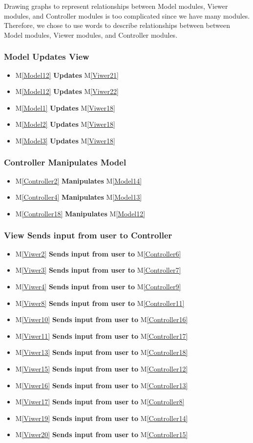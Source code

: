 \documentclass[12pt, titlepage]{article}
\newcommand{\mref}[1]{M\ref{#1}}
\begin{document}
\noindent Drawing graphs to represent relationships between Model modules, Viewer modules, and 
Controller modules is too complicated since we have many modules. Therefore, we chose to 
use words to describe relationships between between Model modules, Viewer modules, and 
Controller modules.

\newcommand{\vb}{\textbf{Updates }}
\subsubsection{Model Updates View}
\begin{itemize}
\item \mref{Model12} \vb \mref{Viwer21}
\item \mref{Model12} \vb \mref{Viwer22}
\item \mref{Model1} \vb \mref{Viwer18}
\item \mref{Model2} \vb \mref{Viwer18}
\item \mref{Model3} \vb \mref{Viwer18}
\end{itemize}

\renewcommand{\vb}{\textbf{Manipulates }}
\subsubsection{Controller Manipulates Model}
\begin{itemize}
\item \mref{Controller2} \vb \mref{Model14}
\item \mref{Controller4} \vb \mref{Model13}
\item \mref{Controller18} \vb \mref{Model12}
\end{itemize}

\renewcommand{\vb}{\textbf{Sends input from user to }}
\subsubsection{View Sends input from user to Controller}
\begin{itemize}
\item \mref{Viwer2} \vb \mref{Controller6}
\item \mref{Viwer3} \vb \mref{Controller7}
\item \mref{Viwer4} \vb \mref{Controller9}
\item \mref{Viwer8} \vb \mref{Controller11}
\item \mref{Viwer10} \vb \mref{Controller16}
\item \mref{Viwer11} \vb \mref{Controller17}
\item \mref{Viwer13} \vb \mref{Controller18}
\item \mref{Viwer15} \vb \mref{Controller12}
\item \mref{Viwer16} \vb \mref{Controller13}
\item \mref{Viwer17} \vb \mref{Controller8}
\item \mref{Viwer19} \vb \mref{Controller14}
\item \mref{Viwer20} \vb \mref{Controller15}
\end{itemize}
\end{document}
